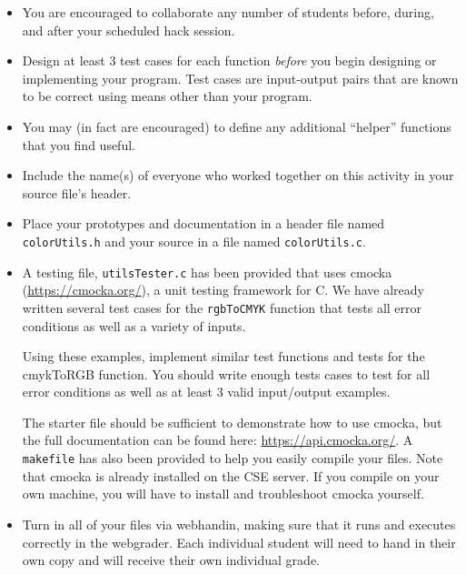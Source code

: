\documentclass[12pt]{scrartcl}
\begin{document}
\begin{itemize}
  \item You are encouraged to collaborate any number of students 
  before, during, and after your scheduled hack session.  
  \item Design at least 3 test cases for each function
  \emph{before} you begin
  designing or implementing your program.  Test cases are 
  input-output pairs that are known to be correct using means
  other than your program.
  \item You may (in fact are encouraged) to define any additional
  ``helper'' functions that you find useful.
  \item Include the name(s) of everyone who worked together on
  this activity in your source file's header.
  \item Place your prototypes and documentation in a header file 
  named \texttt{colorUtils.h} and your source in a file
  named \texttt{colorUtils.c}.
  
  \item A testing file, \texttt{utilsTester.c} has been 
  provided that uses cmocka (\url{https://cmocka.org/}), a unit testing 
  framework for C.  We have already written several test cases 
  for the \texttt{rgbToCMYK} function that tests all error 
  conditions as well as a variety of inputs.
  
  Using these examples, implement similar test functions and 
  tests for the {cmykToRGB} function.  You should write enough
  tests cases to test for all error conditions as well as at least
  3 valid input/output examples.

  The starter file should be sufficient to demonstrate how to use
  cmocka, but the full documentation can be found here: \url{https://api.cmocka.org/}.
  A \texttt{makefile} has also been provided to help
  you easily compile your files.  Note that cmocka is already 
  installed on the CSE server.  If you compile on your own machine, you will
  have to install and troubleshoot cmocka yourself.  
  \item Turn in all of your files via webhandin, making sure that 
  it runs and executes correctly in the webgrader.  Each individual 
  student will need to hand in their own copy and will receive 
  their own individual grade.
\end{itemize}  
\end{document}
